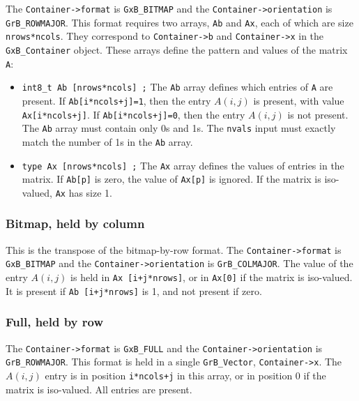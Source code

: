 The \verb'Container->format' is \verb'GxB_BITMAP' and the
\verb'Container->orientation' is \verb'GrB_ROWMAJOR'.
This format requires two arrays, \verb'Ab' and \verb'Ax', each of which are
size \verb'nrows*ncols'.  They correspond to \verb'Container->b' and
\verb'Container->x' in the \verb'GxB_Container' object.  These arrays define
the pattern and values of the matrix \verb'A':

\begin{itemize}
\item \verb'int8_t Ab [nrows*ncols] ;'  The \verb'Ab' array defines which
entries of \verb'A' are present.  If \verb'Ab[i*ncols+j]=1', then the entry
$A(i,j)$ is present, with value \verb'Ax[i*ncols+j]'.  If
\verb'Ab[i*ncols+j]=0', then the entry $A(i,j)$ is not present.  The \verb'Ab'
array must contain only 0s and 1s.  The \verb'nvals' input must exactly match
the number of 1s in the \verb'Ab' array.
\item \verb'type Ax [nrows*ncols] ;'  The \verb'Ax' array defines the values of
entries in the matrix.  If \verb'Ab[p]' is zero, the value of \verb'Ax[p]' is
ignored.  If the matrix is iso-valued, \verb'Ax' has size 1.
\end{itemize}

\subsubsection{Bitmap, held by column}
\label{format_bitmap_by_col}

This is the transpose of the bitmap-by-row format.
The \verb'Container->format' is \verb'GxB_BITMAP' and the
\verb'Container->orientation' is \verb'GrB_COLMAJOR'.
The value of the entry $A(i,j)$ is held in \verb'Ax [i+j*nrows]', or
in \verb'Ax[0]' if the matrix is iso-valued.
It is present if \verb'Ab [i+j*nrows]' is 1, and not present if zero.

\subsubsection{Full, held by row}
\label{format_full_by_row}

The \verb'Container->format' is \verb'GxB_FULL' and the
\verb'Container->orientation' is \verb'GrB_ROWMAJOR'.  This format is held in a
single \verb'GrB_Vector', \verb'Container->x'.  The $A(i,j)$ entry is in
position \verb'i*ncols+j' in this array, or in position 0 if the matrix is
iso-valued.  All entries are present.

